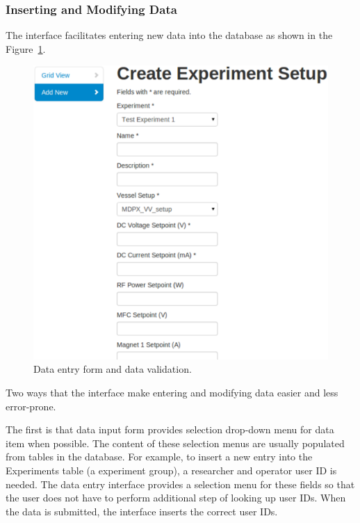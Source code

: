 \subsubsection{Inserting and Modifying Data}

The interface facilitates entering new data into the database as shown in the Figure~\ref{fig:create_exp_setup}.

\begin{figure}[h!]
\centering
\includegraphics[width=6in]{create_experiment_setup.pdf}
\caption{Data entry form and data validation.\label{fig:create_exp_setup}}
\end{figure}

Two ways that the interface make entering and modifying data easier and less error-prone.

The first is that data input form provides selection drop-down menu for data item when possible. The content of these selection menus are usually populated from tables in the database. For example, to insert a new entry into the Experiments table (a experiment group), a researcher and operator user ID is needed. The data entry interface provides a selection menu for these fields so that the user does not have to perform additional step of looking up user IDs. When the data is submitted, the interface inserts the correct user IDs.

